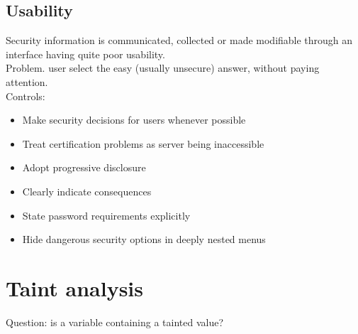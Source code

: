 \documentclass[10pt,a4paper]{book}
\begin{document}
\section{Usability}
Security information is communicated, collected or made modifiable through an interface having quite poor usability.\\
Problem. user select the easy (usually unsecure) answer, without paying attention.\\
Controls:
\begin{itemize}
\item Make security decisions for users whenever possible
\item Treat certification problems as server being inaccessible
\item Adopt progressive disclosure
\item Clearly indicate consequences
\item State password requirements explicitly
\item Hide dangerous security options in deeply nested menus
\end{itemize}
\chapter{Taint analysis}
Question: is a variable containing a tainted value?
\end{document}
